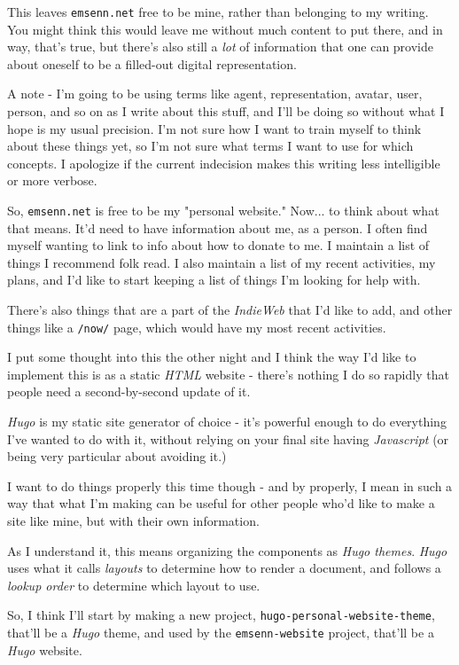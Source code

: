 \documentclass[11pt]{article}
\begin{document}
This leaves \texttt{emsenn.net} free to be mine, rather than belonging to my
writing. You might think this would leave me without much content to
put there, and in way, that's true, but there's also still a \emph{lot} of
information that one can provide about oneself to be a filled-out
digital representation.

A note - I'm going to be using terms like agent, representation,
avatar, user, person, and so on as I write about this stuff, and I'll
be doing so without what I hope is my usual precision. I'm not sure
how I want to train myself to think about these things yet, so I'm not
sure what terms I want to use for which concepts. I apologize if the
current indecision makes this writing less intelligible or more
verbose.

So, \texttt{emsenn.net} is free to be my "personal website." Now... to think
about what that means. It'd need to have information about me, as a
person. I often find myself wanting to link to info about how to
donate to me. I maintain a list of things I recommend folk read. I
also maintain a list of my recent activities, my plans, and I'd like
to start keeping a list of things I'm looking for help with.

There's also things that are a part of the \emph{IndieWeb} that I'd like to
add, and other things like a \texttt{/now/} page, which would have my most
recent activities.

I put some thought into this the other night and I think the way I'd
like to implement this is as a static \emph{HTML} website - there's nothing
I do so rapidly that people need a second-by-second update of it.

\emph{Hugo} is my static site generator of choice - it's powerful enough to
do everything I've wanted to do with it, without relying on your final
site having \emph{Javascript} (or being very particular about avoiding it.)

I want to do things properly this time though - and by properly, I
mean in such a way that what I'm making can be useful for other people
who'd like to make a site like mine, but with their own information.

As I understand it, this means organizing the components as \emph{Hugo
themes}. \emph{Hugo} uses what it calls \emph{layouts} to determine how to
render a document, and follows a \emph{lookup order} to determine which
layout to use.

So, I think I'll start by making a new project,
\texttt{hugo-personal-website-theme}, that'll be a \emph{Hugo} theme, and used by
the \texttt{emsenn-website} project, that'll be a \emph{Hugo} website.
\end{document}
